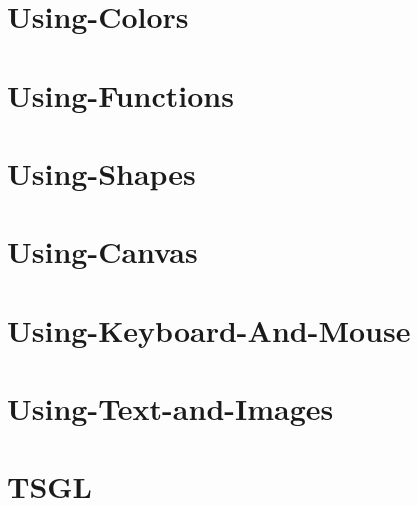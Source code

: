 \documentclass[twoside]{book}
\begin{document}
\chapter{Using-\/\-Colors}
\label{md__home_cpd5_workspace__t_s_g_l_docs-wiki_tutorials__using-_colors}
\hypertarget{md__home_cpd5_workspace__t_s_g_l_docs-wiki_tutorials__using-_colors}{}

\chapter{Using-\/\-Functions}
\label{md__home_cpd5_workspace__t_s_g_l_docs-wiki_tutorials__using-_functions}
\hypertarget{md__home_cpd5_workspace__t_s_g_l_docs-wiki_tutorials__using-_functions}{}

\chapter{Using-\/\-Shapes}
\label{md__home_cpd5_workspace__t_s_g_l_docs-wiki_tutorials__using-_shapes}
\hypertarget{md__home_cpd5_workspace__t_s_g_l_docs-wiki_tutorials__using-_shapes}{}

\chapter{Using-\/\-Canvas}
\label{md__home_cpd5_workspace__t_s_g_l_docs-wiki__using-_canvas}
\hypertarget{md__home_cpd5_workspace__t_s_g_l_docs-wiki__using-_canvas}{}

\chapter{Using-\/\-Keyboard-\/\-And-\/\-Mouse}
\label{md__home_cpd5_workspace__t_s_g_l_docs-wiki__using-_keyboard-_and-_mouse}
\hypertarget{md__home_cpd5_workspace__t_s_g_l_docs-wiki__using-_keyboard-_and-_mouse}{}

\chapter{Using-\/\-Text-\/and-\/\-Images}
\label{md__home_cpd5_workspace__t_s_g_l_docs-wiki__using-_text-and-_images}
\hypertarget{md__home_cpd5_workspace__t_s_g_l_docs-wiki__using-_text-and-_images}{}

\chapter{T\-S\-G\-L}
\label{md__home_cpd5_workspace__t_s_g_l_readme}
\hypertarget{md__home_cpd5_workspace__t_s_g_l_readme}{}

\end{document}
